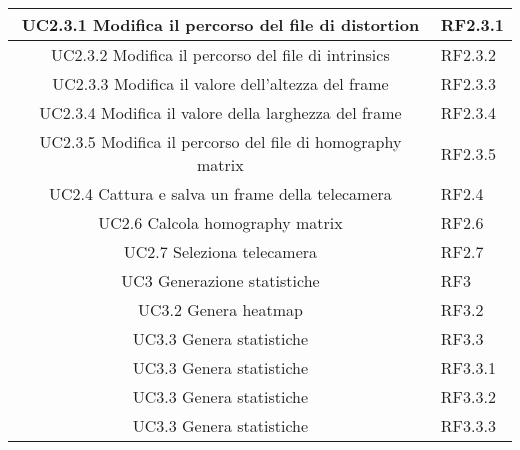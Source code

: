 \begin{center}
\begin{longtable}{ | c | p{1.5cm} |}
UC2.3.1 Modifica il percorso del file di distortion & RF2.3.1 \\ \hline 
UC2.3.2 Modifica il percorso del file di intrinsics & RF2.3.2 \\ \hline 
UC2.3.3 Modifica il valore dell'altezza del frame & RF2.3.3 \\ \hline 
UC2.3.4 Modifica il valore della larghezza del frame & RF2.3.4 \\ \hline 
UC2.3.5 Modifica il percorso del file di homography matrix & RF2.3.5 \\ \hline 
UC2.4 Cattura e salva un frame della telecamera & RF2.4 \\ \hline 
UC2.6 Calcola homography matrix & RF2.6 \\ \hline 
UC2.7 Seleziona telecamera & RF2.7 \\ \hline 
UC3 Generazione statistiche & RF3 \\ \hline 
UC3.2 Genera heatmap & RF3.2 \\ \hline 
UC3.3 Genera statistiche & RF3.3 \\ \hline 
UC3.3 Genera statistiche & RF3.3.1 \\ \hline 
UC3.3 Genera statistiche & RF3.3.2 \\ \hline 
UC3.3 Genera statistiche & RF3.3.3 \\ \hline 
\end{longtable} 

\end{center} 
